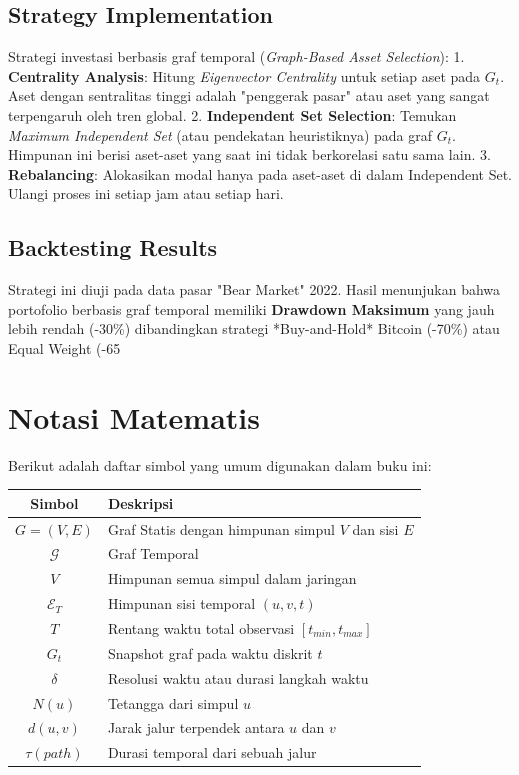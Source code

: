 \documentclass[12pt,a4paper]{book}
\begin{document}
\section{Strategy Implementation}
Strategi investasi berbasis graf temporal (\textit{Graph-Based Asset Selection}):
1.  \textbf{Centrality Analysis}: Hitung \textit{Eigenvector Centrality} untuk setiap aset pada $G_t$. Aset dengan sentralitas tinggi adalah "penggerak pasar" atau aset yang sangat terpengaruh oleh tren global.
2.  \textbf{Independent Set Selection}: Temukan \textit{Maximum Independent Set} (atau pendekatan heuristiknya) pada graf $G_t$. Himpunan ini berisi aset-aset yang saat ini tidak berkorelasi satu sama lain.
3.  \textbf{Rebalancing}: Alokasikan modal hanya pada aset-aset di dalam Independent Set. Ulangi proses ini setiap jam atau setiap hari.

\section{Backtesting Results}
Strategi ini diuji pada data pasar "Bear Market" 2022.
Hasil menunjukan bahwa portofolio berbasis graf temporal memiliki \textbf{Drawdown Maksimum} yang jauh lebih rendah (-30\%) dibandingkan strategi *Buy-and-Hold* Bitcoin (-70\%) atau Equal Weight (-65%

\appendix

\appendix
\chapter{Notasi Matematis}
Berikut adalah daftar simbol yang umum digunakan dalam buku ini:
\begin{table}[h]
\centering
\begin{tabular}{|c|l|}
\hline
\textbf{Simbol} & \textbf{Deskripsi} \\
\hline
$G = (V, E)$ & Graf Statis dengan himpunan simpul $V$ dan sisi $E$ \\
$\mathcal{G}$ & Graf Temporal \\
$V$ & Himpunan semua simpul dalam jaringan \\
$\mathcal{E}_T$ & Himpunan sisi temporal $(u, v, t)$ \\
$T$ & Rentang waktu total observasi $[t_{min}, t_{max}]$ \\
$G_t$ & Snapshot graf pada waktu diskrit $t$ \\
$\delta$ & Resolusi waktu atau durasi langkah waktu \\
$N(u)$ & Tetangga dari simpul $u$ \\
$d(u, v)$ & Jarak jalur terpendek antara $u$ dan $v$ \\
$\tau(path)$ & Durasi temporal dari sebuah jalur \\
\hline
\end{tabular}
\end{table}
\end{document}
